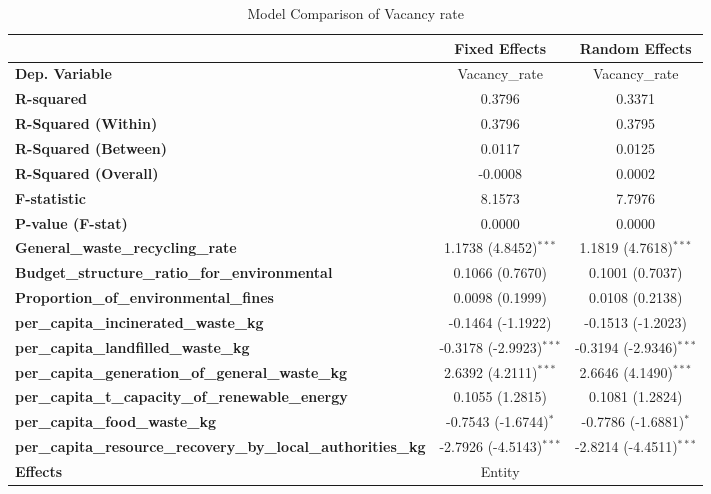 \documentclass{article}
\begin{document}
\begin{table}[H]
        \centering
        \caption{Model Comparison of Vacancy rate}
        \begin{tabular}{lcc}
        \toprule
         & \textbf{Fixed Effects} & \textbf{Random Effects} \\
        \midrule
        \textbf{Dep. Variable} & Vacancy\_rate & Vacancy\_rate \\
        \textbf{R-squared} & 0.3796 & 0.3371 \\
        \textbf{R-Squared (Within)} & 0.3796 & 0.3795 \\
        \textbf{R-Squared (Between)} & 0.0117 & 0.0125 \\
        \textbf{R-Squared (Overall)} & -0.0008 & 0.0002 \\
        \textbf{F-statistic} & 8.1573 & 7.7976 \\
        \textbf{P-value (F-stat)} & 0.0000 & 0.0000 \\
        \midrule
        \textbf{General\_waste\_recycling\_rate} & 1.1738 (4.8452)$^{***}$ & 1.1819 (4.7618)$^{***}$ \\
        \textbf{Budget\_structure\_ratio\_for\_environmental} & 0.1066 (0.7670) & 0.1001 (0.7037) \\
        \textbf{Proportion\_of\_environmental\_fines} & 0.0098 (0.1999) & 0.0108 (0.2138) \\
        \textbf{per\_capita\_incinerated\_waste\_kg} & -0.1464 (-1.1922) & -0.1513 (-1.2023) \\
        \textbf{per\_capita\_landfilled\_waste\_kg} & -0.3178 (-2.9923)$^{***}$ & -0.3194 (-2.9346)$^{***}$ \\
        \textbf{per\_capita\_generation\_of\_general\_waste\_kg} & 2.6392 (4.2111)$^{***}$ & 2.6646 (4.1490)$^{***}$ \\
        \textbf{per\_capita\_t\_capacity\_of\_renewable\_energy} & 0.1055 (1.2815) & 0.1081 (1.2824) \\
        \textbf{per\_capita\_food\_waste\_kg} & -0.7543 (-1.6744)$^{*}$ & -0.7786 (-1.6881)$^{*}$ \\
        \textbf{per\_capita\_resource\_recovery\_by\_local\_authorities\_kg} & -2.7926 (-4.5143)$^{***}$ & -2.8214 (-4.4511)$^{***}$ \\
        \midrule
        \textbf{Effects} & Entity & \\
        \bottomrule
        \end{tabular}
        \end{table}
\end{document}
